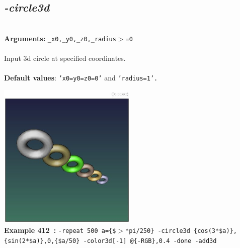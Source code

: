 \documentclass[a4paper,11pt,twoside]{book}
\begin{document}
\subsection{\emph{-circle3d} }\vspace*{-0.5em}
~\\\textbf{Arguments: } 
{\small \texttt{\_x0,\_y0,\_z0,\_radius$>$=0}}\\~\\
Input 3d circle at specified coordinates.
~\\~\\\textbf{Default values}: {\small \texttt{'x0=y0=z0=0'} and \texttt{'radius=1'.}}
\begin{center}\includegraphics[keepaspectratio=true,height=7cm,width=\textwidth]{img/gmic_def412.jpg}\\
{\footnotesize \textbf{Example 412~:} \texttt{-repeat 500 a=\{\$$>$*pi/250\} -circle3d \{cos(3*\$a)\},\{sin(2*\$a)\},0,\{\$a/50\} -color3d[-1] @\{-RGB\},0.4 -done -add3d}}
\end{center}
\end{document}
